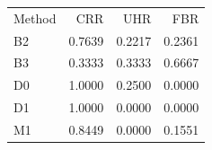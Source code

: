 \begin{tabular}{lrrr}
Method & CRR & UHR & FBR \\
B2 & 0.7639 & 0.2217 & 0.2361 \\
B3 & 0.3333 & 0.3333 & 0.6667 \\
D0 & 1.0000 & 0.2500 & 0.0000 \\
D1 & 1.0000 & 0.0000 & 0.0000 \\
M1 & 0.8449 & 0.0000 & 0.1551 \\
\end{tabular}
